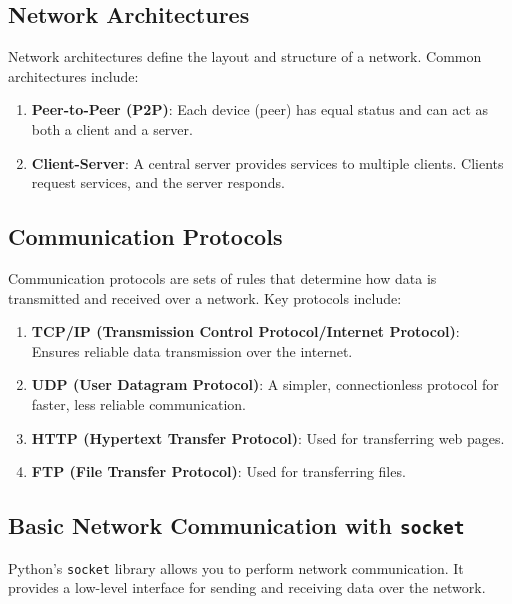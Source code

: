 \documentclass[
  letterpaper,
  DIV=11,
  numbers=noendperiod]{scrreprt}
\providecommand{\tightlist}{%
  \setlength{\itemsep}{0pt}\setlength{\parskip}{0pt}}\usepackage{longtable,booktabs,array}
\begin{document}
\subsection{Network Architectures}\label{network-architectures}

Network architectures define the layout and structure of a network.
Common architectures include:

\begin{enumerate}
\def\labelenumi{\arabic{enumi}.}
\tightlist
\item
  \textbf{Peer-to-Peer (P2P)}: Each device (peer) has equal status and
  can act as both a client and a server.
\item
  \textbf{Client-Server}: A central server provides services to multiple
  clients. Clients request services, and the server responds.
\end{enumerate}

\subsection{Communication Protocols}\label{communication-protocols}

Communication protocols are sets of rules that determine how data is
transmitted and received over a network. Key protocols include:

\begin{enumerate}
\def\labelenumi{\arabic{enumi}.}
\tightlist
\item
  \textbf{TCP/IP (Transmission Control Protocol/Internet Protocol)}:
  Ensures reliable data transmission over the internet.
\item
  \textbf{UDP (User Datagram Protocol)}: A simpler, connectionless
  protocol for faster, less reliable communication.
\item
  \textbf{HTTP (Hypertext Transfer Protocol)}: Used for transferring web
  pages.
\item
  \textbf{FTP (File Transfer Protocol)}: Used for transferring files.
\end{enumerate}

\subsection{\texorpdfstring{Basic Network Communication with
\texttt{socket}}{Basic Network Communication with socket}}\label{basic-network-communication-with-socket}

Python's \texttt{socket} library allows you to perform network
communication. It provides a low-level interface for sending and
receiving data over the network.
\end{document}
